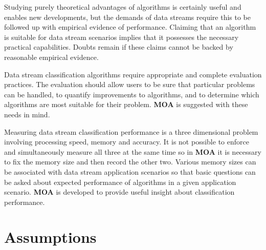 Studying purely theoretical advantages of algorithms is certainly useful and enables new developments, but the demands of data streams require this to be followed up with empirical evidence of performance. Claiming that an algorithm is suitable for data stream scenarios implies that it possesses the necessary practical capabilities. Doubts remain if these claims cannot be backed by reasonable empirical evidence.

Data stream classification algorithms require appropriate and complete evaluation practices. The evaluation should allow users to be sure that particular problems can be handled, to quantify improvements to algorithms, and to determine which algorithms are most suitable for their problem. \textbf{MOA} is suggested with these needs in mind.

Measuring data stream classification performance is a three dimensional problem involving processing speed, memory and accuracy. It is not possible to enforce and simultaneously measure all three at the same time so in %
 \textbf{MOA} %
it is necessary to fix the memory size and then record the other two. Various memory sizes can be associated with data stream application scenarios so that basic questions can be asked about expected performance of algorithms in a given application scenario. \textbf{MOA} is developed to provide useful insight about classification performance.


\section{Assumptions}

